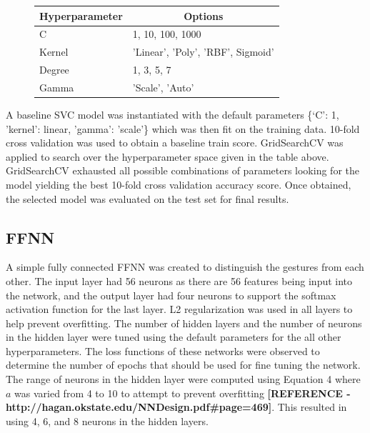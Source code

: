 \documentclass{article}
\begin{document}
\begin{figure}[!htb]
\caption{SVM Hyperparameter Tuning Space}
\begin{table}[H]
\centering
\begin{tabular}{|l|l|}
\hline
\multicolumn{1}{|c|}{\textbf{Hyperparameter}} & \multicolumn{1}{c|}{\textbf{Options}} \\ \hline
C              & 1, 10, 100, 1000                  \\ \hline
Kernel         & 'Linear', 'Poly', 'RBF', Sigmoid' \\ \hline
Degree         & 1, 3, 5, 7                        \\ \hline
Gamma          & 'Scale', 'Auto'                   \\ \hline
\end{tabular}
\end{table}
\end{figure}

A baseline SVC model was instantiated with the default parameters \{‘C’: 1, 'kernel': linear, 'gamma': 'scale'\} which was then fit on the training data. 10-fold cross validation was used to obtain a baseline train score. GridSearchCV was applied to search over the hyperparameter space given in the table above. GridSearchCV exhausted all possible combinations of parameters looking for the model yielding the best 10-fold cross validation accuracy score. Once obtained, the selected model was evaluated on the test set for final results.

\subsection*{FFNN}
A simple fully connected FFNN was created to distinguish the gestures from each other. The input layer had 56 neurons as there are 56 features being input into the network, and the output layer had four neurons to support the softmax activation function for the last layer. L2 regularization was used in all layers to help prevent overfitting. The number of hidden layers and the number of neurons in the hidden layer were tuned using the default parameters for the all other hyperparameters. The loss functions of these networks were observed to determine the number of epochs that should be used for fine tuning the network. The range of neurons in the hidden layer were computed using Equation 4 where $a$ was varied from 4 to 10 to attempt to prevent overfitting \textbf{[REFERENCE - http://hagan.okstate.edu/NNDesign.pdf\#page=469]}. This resulted in using 4, 6, and 8 neurons in the hidden layers.
\end{document}
